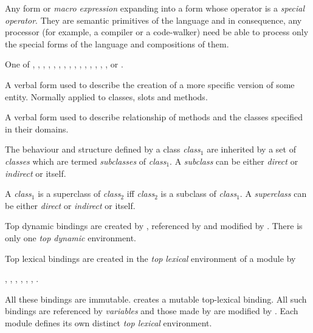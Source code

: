 \begin{optDefinition}
\begin{definitions}
      Any form or {\em
        macro expression} expanding into a form whose operator is a {\em special
        operator}.  They are semantic primitives of the language and in
    consequence, any processor (for example, a compiler or a code-walker) need
    be able to process only the special forms of the language and compositions
    of them.

      One of
    , ,
    , ,
    , , ,
    , , ,
    , , ,
    , , or
    .

     A verbal form used to
    describe the creation of a more specific version of some entity.  Normally
    applied to classes, slots and methods.

     A verbal form used
    to describe relationship of methods and the classes specified in their
    domains.

      The behaviour and structure
    defined by a class {\em class$_1$} are inherited by a set of {\em classes}
    which are termed {\em subclasses} of {\em class$_1$}.  A {\em subclass} can
    be either {\em direct} or {\em indirect} or itself.

      A {\em class$_1$} is a
    superclass of {\em class$_2$} iff {\em class$_2$} is a subclass of {\em
        class$_1$}.  A {\em superclass} can be either {\em direct} or {\em
        indirect} or itself.

     Top dynamic bindings
    are created by , referenced by 
    and modified by .  There is only one {\em top
        dynamic} environment.

     Top lexical bindings
    are created in the {\em top} {\em lexical} environment of a module by
    \begin{flushleft} , ,
        , ,
        , , .
    \end{flushleft}
    All these bindings are immutable.   creates a mutable
    top-lexical binding.  All such bindings are referenced by {\em variables}
    and those made by  are modified by .
    Each module defines its own distinct {\em top lexical} environment.

\end{definitions}
\end{optDefinition}
